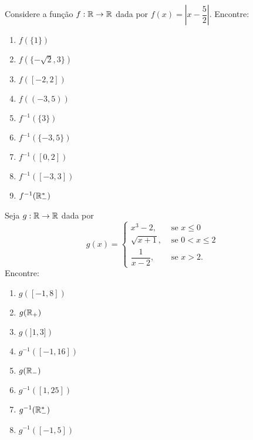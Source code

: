 \documentclass[12pt]{exam}
\begin{document}
    \vspace{.6cm}

    \questao{} Considere a fun\c{c}\~ao $f : \mathbb{R} \to \mathbb{R}$ dada por $f(x) = \left| x - \dfrac{5}{2}\right|$. Encontre:
    \begin{multicols}{3}
        \begin{enumerate}[label={\alph*})]
            \item $f(\{1\})$

            \item $f(\{-\sqrt{2}, 3\})$

            \item $f([-2,2])$

            \item $f((-3,5))$

            \item $f^{-1}(\{3\})$

            \item $f^{-1}(\{-3,5\})$

            \item $f^{-1}([0,2])$

            \item $f^{-1}([-3,3])$

            \item $f^{-1}(\mathbb{R}^*_-)$
        \end{enumerate}
    \end{multicols}

    \vspace{.3cm}

    \questao{} Seja $g : \mathbb{R} \to \mathbb{R}$ dada por
    \[
        g(x) = \begin{cases}
            x^3 - 2,& \mbox{ se } x \le 0\\
            \sqrt{x + 1}, & \mbox{ se } 0 < x \le 2\\
            \dfrac{1}{x - 2}, & \mbox{ se } x > 2.
        \end{cases}
    \]
    Encontre:
    \begin{multicols}{2}
        \begin{enumerate}[label={\alph*})]
            \item $g([-1,8])$

            \item $g(\mathbb{R}_+)$

            \item $g(]1, 3])$

            \item $g^{-1}([-1,16])$

            \item $g(\mathbb{R}_-)$

            \item $g^{-1}([1,25])$

            \item $g^{-1}(\mathbb{R}^*_-)$

            \item $g^{-1}([-1,5])$
        \end{enumerate}
    \end{multicols}
\end{document}
